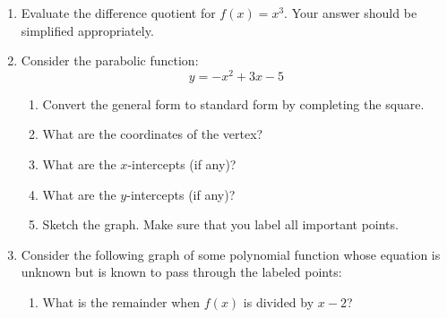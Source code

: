 \documentclass[letterpaper,12pt,fleqn]{article}
\begin{document}
\begin{enumerate}
  \newpage

\item Evaluate the difference quotient for $f(x)=x^3$. Your answer should be
  simplified appropriately.

  \newpage

\item Consider the parabolic function:
  \[y=-x^2+3x-5\]
  \begin{enumerate}
  \item Convert the general form to standard form by completing the square.

    \vspace{3in}
    
  \item What are the coordinates of the vertex?

    \vspace{1in}
    
  \item What are the $x$-intercepts (if any)?

    \vspace{2in}

  \item What are the $y$-intercepts (if any)?

    \newpage

  \item Sketch the graph. Make sure that you label all important points.
  \end{enumerate}

  \newpage

\item Consider the following graph of some polynomial function whose equation
  is unknown but is known to pass through the labeled points:


  \begin{enumerate}
  \item What is the remainder when $f(x)$ is divided by $x-2$?

    \vspace{1in}
    

\end{enumerate}
\end{enumerate}
\end{document}
